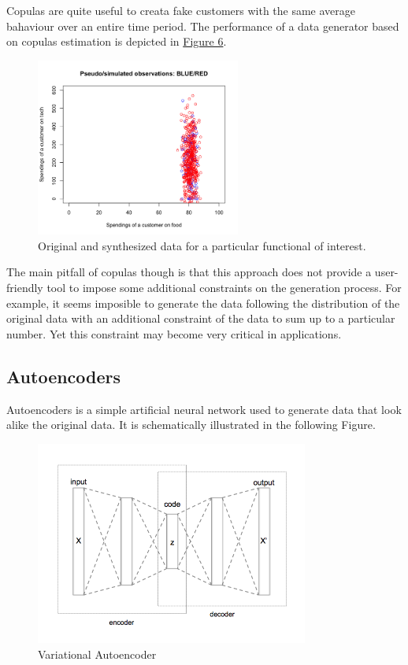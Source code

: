 \documentclass[]{article}
\begin{document}
Copulas are quite useful to creata fake customers with the same average
bahaviour over an entire time period. The performance of a data
generator based on copulas estimation is depicted in
\href{Copula}{Figure 6}.

\begin{figure}
    \centering
    \includegraphics[width=0.6\textwidth]{uploads/upload_5818ee038f726ed6bde7bd783eb02212.png}
    \caption{Original and synthesized data for a particular functional of
interest.}
    \label{fig:copula_tech_vs_food}
\end{figure}

The main pitfall of copulas though is that this approach does not
provide a user-friendly tool to impose some additional constraints on
the generation process. For example, it seems imposible to generate the
data following the distribution of the original data with an additional
constraint of the data to sum up to a particular number. Yet this
constraint may become very critical in applications.

\subsection{Autoencoders}\label{autoencoders}

Autoencoders is a simple artificial neural network used to generate data
that look alike the original data. It is schematically illustrated in
the following Figure.

\begin{figure}
    \centering
    \includegraphics[width=0.8\textwidth]{uploads/upload_155f5da53a718fb42fa123c51e721762.png}
    \caption{Variational Autoencoder}
    \label{fig:autoencoder}
\end{figure}
\end{document}
